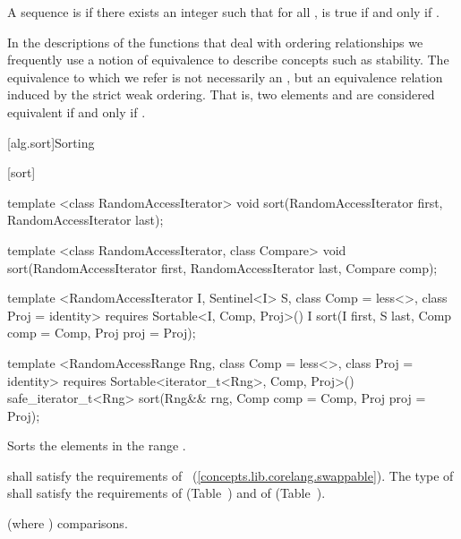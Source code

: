 \pnum
A sequence
is
if there exists an integer
such that for all
,
is true if and only if
.

\pnum
In the descriptions of the functions that deal with ordering relationships we frequently use a notion of
equivalence to describe concepts such as stability.
The equivalence to which we refer is not necessarily an
,
but an equivalence relation induced by the strict weak ordering.
That is, two elements
and
are considered equivalent if and only if
.

[alg.sort]{Sorting}

[sort]{}

%
\begin{removedblock}
\begin{itemdecl}
template <class RandomAccessIterator>
  void sort(RandomAccessIterator first, RandomAccessIterator last);

template <class RandomAccessIterator, class Compare>
  void sort(RandomAccessIterator first, RandomAccessIterator last,
            Compare comp);
\end{itemdecl}
\end{removedblock}
\begin{addedblock}
\begin{itemdecl}
template <RandomAccessIterator I, Sentinel<I> S, class Comp = less<>,
    class Proj = identity>
  requires Sortable<I, Comp, Proj>()
  I sort(I first, S last, Comp comp = Comp{}, Proj proj = Proj{});

template <RandomAccessRange Rng, class Comp = less<>, class Proj = identity>
  requires Sortable<iterator_t<Rng>, Comp, Proj>()
  safe_iterator_t<Rng>
    sort(Rng&& rng, Comp comp = Comp{}, Proj proj = Proj{});
\end{itemdecl}
\end{addedblock}

\begin{itemdescr}
\pnum
\effects
Sorts the elements in the range
.

\begin{removedblock}
\pnum
\requires
{} shall satisfy the requirements of
~(\ref{concepts.lib.corelang.swappable}). The type
of  shall satisfy the requirements of
 (Table~) and of
 (Table~).
\end{removedblock}

\pnum
\complexity
{}
(where
)
comparisons.
\end{itemdescr}

